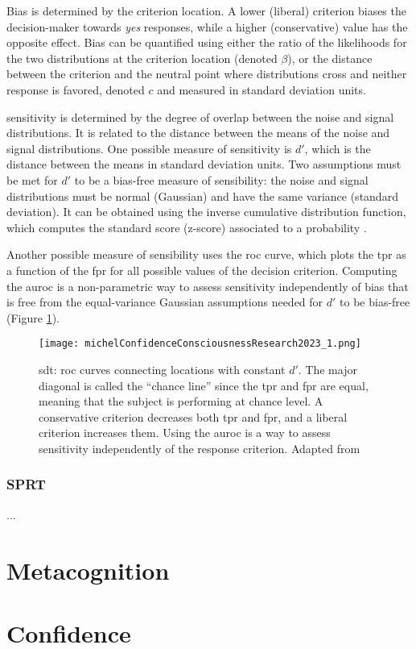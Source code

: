 Bias is determined by the criterion location. A lower (liberal) criterion biases the decision-maker towards \textit{yes} responses, while a higher (conservative) value has the opposite effect. Bias can be quantified using either the ratio of the likelihoods for the two distributions at the criterion location (denoted $\beta$), or the distance between the criterion and the neutral point where distributions cross and neither response is favored, denoted $c$ and measured in standard deviation units.

\Gls{sensitivity} is determined by the degree of overlap between the noise and signal distributions. It is related to the distance between the means of the noise and signal distributions. One possible measure of \gls{sensitivity} is $d'$, which is the distance between the means in standard deviation units. Two assumptions must be met for $d'$ to be a bias-free measure of sensibility: the noise and signal distributions must be normal (Gaussian) and have the same variance (standard deviation). It can be obtained using the inverse cumulative distribution function, which computes the standard score (z-score) associated to a probability \cite{stanislawCalculationSignalDetection1999}.

Another possible measure of sensibility uses the \acrfull{roc} curve, which plots the \acrlong{tpr} as a function of the \acrlong{fpr} for all possible values of the decision criterion. Computing the \acrfull{auroc} is a non-parametric way to assess \gls{sensitivity} independently of bias that is free from the equal-variance Gaussian assumptions needed for $d'$ to be bias-free \cite{flemingHowMeasureMetacognition2014} (Figure \ref{figure:roc_curves}).

\begin{figure}[ht]
    \centering
    \texttt{[image: michelConfidenceConsciousnessResearch2023\_1.png]}
    \caption[\acrlong{sdt}: \acrshort{roc} curves]{\acrlong{sdt}: \acrshort{roc} curves connecting locations with constant $d'$. The major diagonal is called the “chance line” since the \acrlong{tpr} and \acrlong{fpr} are equal, meaning that the subject is performing at chance level. A conservative criterion decreases both \acrshort{tpr} and \acrshort{fpr}, and a liberal criterion increases them. Using the \acrlong{auroc} is a way to assess \gls{sensitivity} independently of the response criterion. Adapted from \cite{michelConfidenceConsciousnessResearch2023}}
    \label{figure:roc_curves}
\end{figure}

\subsubsection{SPRT}

...

\section{Metacognition}

\section{Confidence}